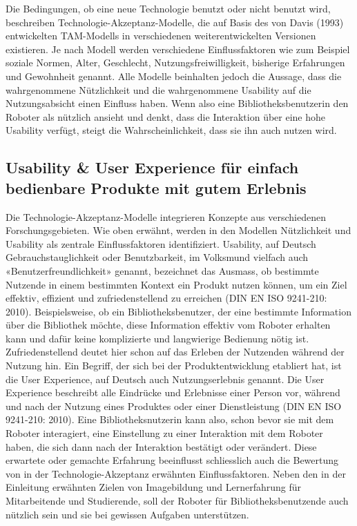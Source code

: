 \documentclass[a4paper,
fontsize=11pt,
oneside,
numbers=noperiodatend,
parskip=half-,
bibliography=totoc,
final
]{scrartcl}
\begin{document}
Die Bedingungen, ob eine neue Technologie benutzt oder nicht benutzt
wird, beschreiben Techno\-logie-Akzeptanz-Modelle, die auf Basis des von
Davis (1993) entwickelten TAM-Modells in verschiedenen
weiterentwickelten Versionen existieren. Je nach Modell werden
verschiedene Einflussfaktoren wie zum Beispiel soziale Normen, Alter,
Geschlecht, Nutzungsfreiwilligkeit, bisherige Erfahrungen und Gewohnheit
genannt. Alle Modelle beinhalten jedoch die Aussage, dass die
wahrgenommene Nützlichkeit und die wahrgenommene Usability auf die
Nutzungsabsicht einen Einfluss haben. Wenn also eine
Bibliotheksbenutzerin den Roboter als nützlich ansieht und denkt, dass
die Interaktion über eine hohe Usability verfügt, steigt die
Wahrscheinlichkeit, dass sie ihn auch nutzen wird.

\hypertarget{usability-user-experience-fuxfcr-einfach-bedienbare-produkte-mit-gutem-erlebnis}{%
\subsection{Usability \& User Experience für einfach bedienbare Produkte mit gutem Erlebnis}\label{usability-user-experience-fuxfcr-einfach-bedienbare-produkte-mit-gutem-erlebnis}}

Die Technologie-Akzeptanz-Modelle integrieren Konzepte aus verschiedenen
Forschungsgebieten. Wie oben erwähnt, werden in den Modellen
Nützlichkeit und Usability als zentrale Einflussfaktoren identifiziert.
Usability, auf Deutsch Gebrauchstauglichkeit oder Benutzbarkeit, im
Volksmund vielfach auch «Benutzerfreundlichkeit» genannt, bezeichnet das
Ausmass, ob bestimmte Nutzende in einem bestimmten Kontext ein Produkt
nutzen können, um ein Ziel effektiv, effizient und zufriedenstellend zu
erreichen (DIN EN ISO 9241-210: 2010). Beispielsweise, ob ein
Bibliotheksbenutzer, der eine bestimmte Information über die Bibliothek
möchte, diese Information effektiv vom Roboter erhalten kann und dafür
keine komplizierte und langwierige Bedienung nötig ist.
Zufriedenstellend deutet hier schon auf das Erleben der Nutzenden
während der Nutzung hin. Ein Begriff, der sich bei der
Produktentwicklung etabliert hat, ist die User Experience, auf Deutsch
auch Nutzungserlebnis genannt. Die User Experience beschreibt alle
Eindrücke und Erlebnisse einer Person vor, während und nach der Nutzung
eines Produktes oder einer Dienstleistung (DIN EN ISO 9241-210: 2010).
Eine Bibliotheksnutzerin kann also, schon bevor sie mit dem Roboter
interagiert, eine Einstellung zu einer Interaktion mit dem Roboter
haben, die sich dann nach der Interaktion bestätigt oder verändert.
Diese erwartete oder gemachte Erfahrung beeinflusst schliesslich auch
die Bewertung von in der Technologie-Akzeptanz erwähnten
Einflussfaktoren. Neben den in der Einleitung erwähnten Zielen von
Imagebildung und Lernerfahrung für Mitarbeitende und Studierende, soll
der Roboter für Bibliotheksbenutzende auch nützlich sein und sie bei
gewissen Aufgaben unterstützen.
\end{document}
